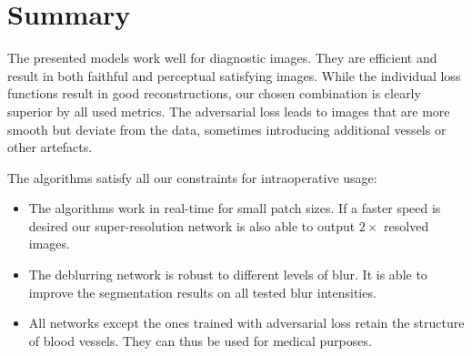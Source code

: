 \documentclass{scrartcl}
\begin{document}
\section{Summary}

The presented models work well for diagnostic images.
They are efficient and result in both faithful and perceptual satisfying images.
While the individual loss functions result in good reconstructions, our chosen combination is clearly superior by all used metrics.
The adversarial loss leads to images that are more smooth but deviate from the data, sometimes introducing additional vessels or other artefacts.

The algorithms satisfy all our constraints for intraoperative usage:
\begin{itemize}
\item The algorithms work in real-time for small patch sizes.
  If a faster speed is desired our super-resolution network is also able to output $2\times$ resolved images.
\item The deblurring network is robust to different levels of blur.
  It is able to improve the segmentation results on all tested blur intensities.
\item All networks except the ones trained with adversarial loss retain the structure of blood vessels.
  They can thus be used for medical purposes.
\end{itemize}

\printbibliography
\end{document}
